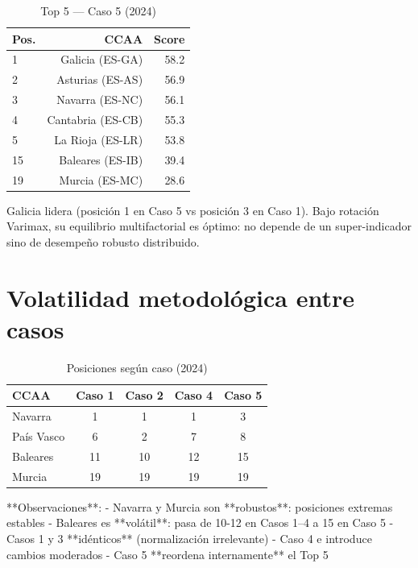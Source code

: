 \begin{table}[H]
    \centering
    \small
    \begin{tabular}{lrr}
        \toprule
        \textbf{Pos.} & \textbf{CCAA} & \textbf{Score} \\
        \midrule
        1 & Galicia (ES-GA) & 58.2 \\
        2 & Asturias (ES-AS) & 56.9 \\
        3 & Navarra (ES-NC) & 56.1 \\
        4 & Cantabria (ES-CB) & 55.3 \\
        5 & La Rioja (ES-LR) & 53.8 \\
        \midrule
        15 & Baleares (ES-IB) & 39.4 \\
        19 & Murcia (ES-MC) & 28.6 \\
        \bottomrule
    \end{tabular}
    \caption{Top 5 — Caso 5 (2024)}
\end{table}

Galicia lidera (posición 1 en Caso 5 vs posición 3 en Caso 1). Bajo rotación Varimax, su equilibrio multifactorial es óptimo: no depende de un super-indicador sino de desempeño robusto distribuido.

\section{Volatilidad metodológica entre casos}

\begin{table}[H]
    \centering
    \small
    \begin{tabular}{lcccc}
        \toprule
        \textbf{CCAA} & \textbf{Caso 1} & \textbf{Caso 2} & \textbf{Caso 4} & \textbf{Caso 5} \\
        \midrule
        Navarra & 1 & 1 & 1 & 3 \\
        País Vasco & 6 & 2 & 7 & 8 \\
        Baleares & 11 & 10 & 12 & 15 \\
        Murcia & 19 & 19 & 19 & 19 \\
        \bottomrule
    \end{tabular}
    \caption{Posiciones según caso (2024)}
\end{table}

**Observaciones**:
- Navarra y Murcia son **robustos**: posiciones extremas estables
- Baleares es **volátil**: pasa de 10-12 en Casos 1--4 a 15 en Caso 5
- Casos 1 y 3 **idénticos** (normalización irrelevante)
- Caso 4 e introduce cambios moderados
- Caso 5 **reordena internamente** el Top 5


